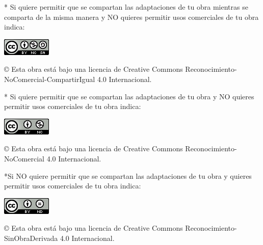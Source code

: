 \documentclass[spanish,a4paper,12pt,oneside]{extreport}
\begin{document}
\bigskip
\bigskip
\bigskip
* Si quiere permitir que se compartan las adaptaciones de tu obra mientras se comparta de la misma manera y NO quieres permitir usos comerciales de tu obra indica:

\begin{center}
\includegraphics[scale=1.8]{images/by-nc-sa_88x31}\\[5mm]
\end{center}

\begin{large}
© Esta obra está bajo una licencia de Creative Commons Reconocimiento-NoComercial-CompartirIgual 4.0 Internacional.
\end{large}

\bigskip
\bigskip
\bigskip
* Si quiere permitir que se compartan las adaptaciones de tu obra y NO quieres permitir usos comerciales de tu obra indica:

\begin{center}
\includegraphics[scale=1.8]{images/by-nc_88x31}\\[5mm]
\end{center}

\begin{large}
© Esta obra está bajo una licencia de Creative Commons Reconocimiento-NoComercial 4.0 Internacional.
\end{large}

\newpage
\thispagestyle{empty}

\bigskip
*Si NO quiere permitir que se compartan las adaptaciones de tu obra y quieres permitir usos comerciales de tu obra indica:

\begin{center}
\includegraphics[scale=1.8]{images/by-nd_88x31}\\[5mm]
\end{center}

\begin{large}
© Esta obra está bajo una licencia de Creative Commons Reconocimiento-SinObraDerivada 4.0 Internacional.
\end{large}
\end{document}
